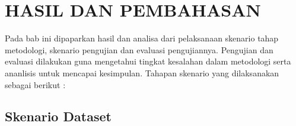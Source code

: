 \chapter{HASIL DAN PEMBAHASAN}


Pada bab ini dipaparkan hasil dan analisa dari pelaksanaan skenario tahap  metodologi, skenario pengujian dan evaluasi pengujiannya. Pengujian dan evaluasi dilakukan guna mengetahui tingkat kesalahan dalam metodologi serta ananlisis untuk mencapai kesimpulan. Tahapan skenario yang dilaksanakan sebagai berikut :



\section{Skenario Dataset}

